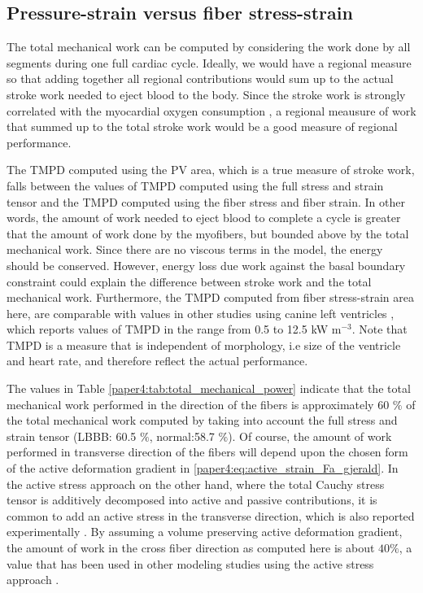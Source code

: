 \subsection{Pressure-strain versus fiber stress-strain}

The total mechanical work can be computed by considering the work done
by all segments during one full cardiac cycle. Ideally, we would have
a regional measure so that adding together all regional contributions
would sum up to the actual stroke work needed to eject blood to the
body. Since the stroke work is strongly correlated with the myocardial
oxygen consumption \cite{suga1979total}, a regional meausure of work
that summed up to the total stroke work would be a good measure of
regional performance. 

The TMPD computed using the PV area, which is a true measure of stroke
work, falls between the values of TMPD computed using the full stress
and strain tensor and the TMPD computed using the fiber stress and
fiber strain. In other words, the amount of work needed to eject blood
to complete a cycle is greater that the amount of work done by the
myofibers, but bounded above by the total mechanical work. Since there
are no viscous terms in the model, the energy should be
conserved. However, energy loss due work against the basal boundary
constraint could explain the difference between stroke work and the
total mechanical work. Furthermore, the TMPD computed from fiber
stress-strain area here, are comparable with values in other studies
using canine left ventricles \cite{delhaas1994regional}, which reports
values of TMPD in the range from 0.5 to 12.5 kW m$^{-3}$. Note that
TMPD is a measure that is independent of morphology, i.e size of the
ventricle and heart rate, and therefore reflect the actual performance.

The values in Table \ref{paper4:tab:total_mechanical_power} indicate that the
total mechanical work performed in the direction of the fibers is
approximately 60 $\%$ of the 
total mechanical work computed by taking into account the full stress
and strain tensor (LBBB: 60.5 $\%$, normal:58.7 $\%$). Of course, the
amount of work performed in transverse direction of the fibers will depend upon the
chosen form of the active deformation gradient in
\eqref{paper4:eq:active_strain_Fa_gjerald}. In the active stress approach on 
the other hand, where the total Cauchy stress tensor is additively decomposed into
active and passive contributions, it is common to add an active stress
in the transverse direction, which is also reported
experimentally \cite{lin1998multiaxial}. By assuming
a volume preserving active deformation gradient, the amount of
work in the cross fiber direction as computed here is about $40 \%$, a
value that has been used in other modeling studies using the active
stress approach \cite{sun2009computationally}.

